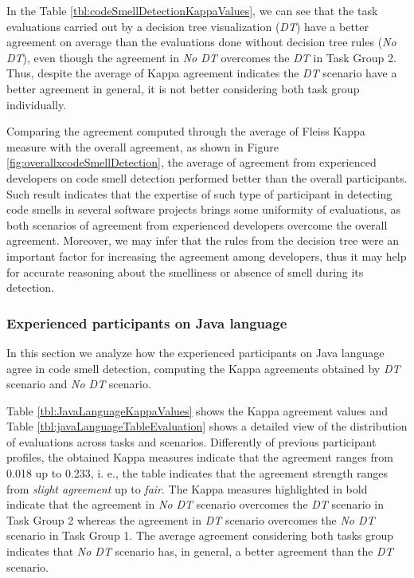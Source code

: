 In the Table \ref{tbl:codeSmellDetectionKappaValues}, we can see that the task evaluations carried out by a decision tree visualization (\textit{DT}) have a better agreement on average than the evaluations done without decision tree rules (\textit{No DT}), even though the agreement in \textit{No DT} overcomes the \textit{DT} in Task Group 2. Thus, despite the average of Kappa agreement indicates the \textit{DT} scenario have a better agreement in general, it is not better considering both task group individually.

Comparing the agreement computed through the average of Fleiss Kappa measure with the overall agreement, as shown in Figure \ref{fig:overallxcodeSmellDetection}, the average of agreement from experienced developers on code smell detection performed better than the overall participants. Such result indicates that the expertise of such type of participant in detecting code smells in several software projects brings some uniformity of evaluations, as both scenarios of agreement from experienced developers overcome the overall agreement. Moreover, we may infer that the rules from the decision tree were an important factor for increasing the agreement among developers, thus it may help for accurate reasoning about the smelliness or absence of smell during its detection. 

\subsubsection{Experienced participants on Java language} \label{sec:participantsJavaAgreement}    

In this section we analyze how the experienced participants on Java language agree in code smell detection, computing the Kappa agreements obtained by \textit{DT} scenario and \textit{No DT} scenario.

Table \ref{tbl:JavaLanguageKappaValues} shows the Kappa agreement values and Table \ref{tbl:javaLanguageTableEvaluation} shows a detailed view of the distribution of evaluations across tasks and scenarios. Differently of previous participant profiles, the obtained Kappa measures indicate that the agreement ranges from 0.018 up to 0.233, i. e., the table indicates that the agreement strength ranges from \textit{slight agreement} up to \textit{fair}. The Kappa measures highlighted in bold indicate that the agreement in \textit{No DT} scenario overcomes the \textit{DT} scenario in Task Group 2 whereas the agreement in \textit{DT} scenario overcomes the \textit{No DT} scenario in Task Group 1. The average agreement considering both tasks group indicates that \textit{No DT} scenario has, in general, a better agreement than the \textit{DT} scenario. 

